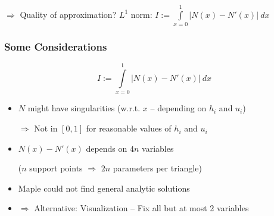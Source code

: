 \documentclass{beamer}
\newcommand{\todo}[1]{
  \textcolor{red}{TODO: #1}
  \note{\textcolor{red}{TODO: #1}}
}
\renewcommand{\todo}[1]{}
\begin{document}
\begin{frame}
\begin{columns}
\begin{column}{.4\textwidth}
\begin{center}
      \end{center}
    \end{column}
  \end{columns}
  
  \begin{center}
    $\Rightarrow$ Quality of approximation? $L^1$ norm: $I := \int\limits_{x=0}^1 | N(x) - N'(x) |\ dx$ \todo{Hier wollte der Martin $L^1$-Norm drinstehen haben. Zu wenig Platz}
  \end{center}
\end{frame}

\begin{frame}
  \frametitle{Some Considerations}
  \begin{equation*}
    I := \int\limits_{x=0}^1 | N(x) - N'(x) |\ dx
  \end{equation*}
  \begin{itemize}
  \item $N$ might have singularities (w.r.t. $x$ -- depending on $h_i$ and $u_i$) 

    $\Rightarrow$ Not in $[0,1]$ for reasonable values of $h_i$ and $u_i$
  \item $N(x)-N'(x)$ depends on $4n$ variables
    
    ($n$ support points $\Rightarrow$ $2n$ parameters per triangle)
  \item Maple could not find general analytic solutions \todo{Rausnehmen?}
  \item $\Rightarrow$ Alternative: Visualization -- Fix all but at most 2 variables
  \end{itemize}
\end{frame}
\end{document}
